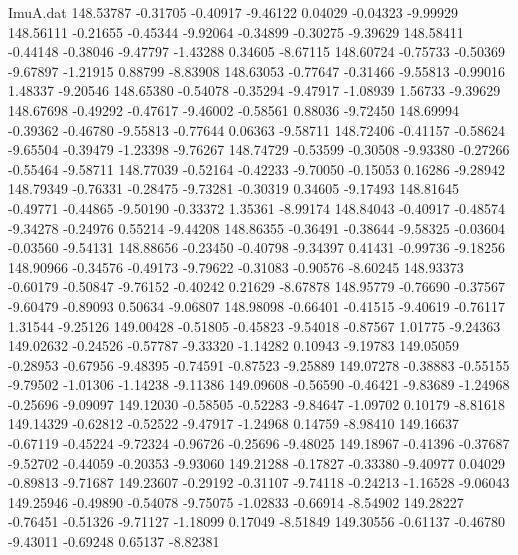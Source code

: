 \begin{filecontents}{ImuA.dat}
 148.53787   -0.31705   -0.40917   -9.46122    0.04029   -0.04323   -9.99929
 148.56111   -0.21655   -0.45344   -9.92064   -0.34899   -0.30275   -9.39629
 148.58411   -0.44148   -0.38046   -9.47797   -1.43288    0.34605   -8.67115
 148.60724   -0.75733   -0.50369   -9.67897   -1.21915    0.88799   -8.83908
 148.63053   -0.77647   -0.31466   -9.55813   -0.99016    1.48337   -9.20546
 148.65380   -0.54078   -0.35294   -9.47917   -1.08939    1.56733   -9.39629
 148.67698   -0.49292   -0.47617   -9.46002   -0.58561    0.88036   -9.72450
 148.69994   -0.39362   -0.46780   -9.55813   -0.77644    0.06363   -9.58711
 148.72406   -0.41157   -0.58624   -9.65504   -0.39479   -1.23398   -9.76267
 148.74729   -0.53599   -0.30508   -9.93380   -0.27266   -0.55464   -9.58711
 148.77039   -0.52164   -0.42233   -9.70050   -0.15053    0.16286   -9.28942
 148.79349   -0.76331   -0.28475   -9.73281   -0.30319    0.34605   -9.17493
 148.81645   -0.49771   -0.44865   -9.50190   -0.33372    1.35361   -8.99174
 148.84043   -0.40917   -0.48574   -9.34278   -0.24976    0.55214   -9.44208
 148.86355   -0.36491   -0.38644   -9.58325   -0.03604   -0.03560   -9.54131
 148.88656   -0.23450   -0.40798   -9.34397    0.41431   -0.99736   -9.18256
 148.90966   -0.34576   -0.49173   -9.79622   -0.31083   -0.90576   -8.60245
 148.93373   -0.60179   -0.50847   -9.76152   -0.40242    0.21629   -8.67878
 148.95779   -0.76690   -0.37567   -9.60479   -0.89093    0.50634   -9.06807
 148.98098   -0.66401   -0.41515   -9.40619   -0.76117    1.31544   -9.25126
 149.00428   -0.51805   -0.45823   -9.54018   -0.87567    1.01775   -9.24363
 149.02632   -0.24526   -0.57787   -9.33320   -1.14282    0.10943   -9.19783
 149.05059   -0.28953   -0.67956   -9.48395   -0.74591   -0.87523   -9.25889
 149.07278   -0.38883   -0.55155   -9.79502   -1.01306   -1.14238   -9.11386
 149.09608   -0.56590   -0.46421   -9.83689   -1.24968   -0.25696   -9.09097
 149.12030   -0.58505   -0.52283   -9.84647   -1.09702    0.10179   -8.81618
 149.14329   -0.62812   -0.52522   -9.47917   -1.24968    0.14759   -8.98410
 149.16637   -0.67119   -0.45224   -9.72324   -0.96726   -0.25696   -9.48025
 149.18967   -0.41396   -0.37687   -9.52702   -0.44059   -0.20353   -9.93060
 149.21288   -0.17827   -0.33380   -9.40977    0.04029   -0.89813   -9.71687
 149.23607   -0.29192   -0.31107   -9.74118   -0.24213   -1.16528   -9.06043
 149.25946   -0.49890   -0.54078   -9.75075   -1.02833   -0.66914   -8.54902
 149.28227   -0.76451   -0.51326   -9.71127   -1.18099    0.17049   -8.51849
 149.30556   -0.61137   -0.46780   -9.43011   -0.69248    0.65137   -8.82381

\end{filecontents}
